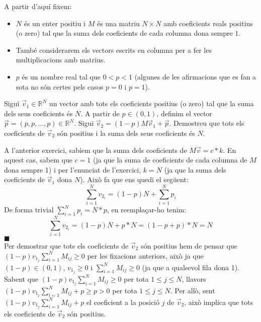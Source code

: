 \documentclass[a4paper, 12pt]{article}
\begin{document}
    \noindent A partir d'aquí fixem:
    \begin{itemize}
        \item $N$ és un enter positiu i $M$ és una matriu $N \times N$ amb coeficients reals positius
        (o zero) tal que la suma dels coeficients de cada columna dona sempre $1$.
        \item També considerarem els vectors escrits en columna per a fer les multiplicacions amb
        matrius.
        \item $p$ és un nombre real tal que $0 < p < 1$ (algunes de les afirmacions que es fan a sota
        no són certes pels casos $p = 0$ i $p = 1$).
    \end{itemize}
    
    \begin{exercici}
        Sigui $\vec{v}_1 \in \mathbb{R}^N$ un vector amb tots els coeficients positius (o zero) tal que
        la suma dels seus coeficients és $N$. A partir de $p \in (0, 1)$, definim el vector $\vec{p} = (p, p, \dots, p) \in \mathbb{R}^N$.
        Sigui $\vec{v}_2 = (1 - p)M\vec{v}_1 + \vec{p}$. Demostreu que tots els coeficients de $\vec{v}_2$
        són positius i la suma dels seus coeficients és $N$. 
    \end{exercici}
    \begin{solucio}
        A l'anterior exercici, sabíem que la suma dels coeficients de $M\vec{v} = c*k$. En aquest cas,
        sabem que $c = 1$ (ja que la suma de coeficients de cada columna de $M$ dona sempre 1) i per
        l'enunciat de l'exercici, $k = N$ (ja que la suma dels coeficients de $\vec{v}_1$ dona $N$).
        Això fa que ens quedi el següent:
        \begin{displaymath}
            \sum_{i=1}^{N} v_{2_i} = (1-p)N+\sum_{i=1}^{N}p_i
        \end{displaymath}
        De forma trivial $\sum_{i=1}^{N}p_i = N*p$, en reemplaçar-ho tenim:
        \begin{displaymath}
            \sum_{i=1}^{N} v_{2_i} = (1-p)N+p*N = (1-p+p)*N = N
        \end{displaymath}
        \hfill$\blacksquare$\\
        Per demostrar que tots els coeficients de $\vec{v}_2$ són positius hem de pensar que $(1 - p) v_{1_j} \sum_{i=1}^{N}M_{ij} \geq 0$
        per les fixacions anteriors, això ja que $(1 - p) \in (0, 1)$, $v_{1_j} \geq 0$ i $\sum_{i=1}^{N}M_{ij} \geq 0$
        (ja que a qualsevol fila dona 1).\\
        Sabent que $(1 - p) v_{1_j} \sum_{i=1}^{N}M_{ij} \geq 0$ per tota $1 \leq j \leq N$, llavors $(1 - p) v_{1_j} \sum_{i=1}^{N}M_{ij} + p \geq p > 0$
        per tota $1 \leq j \leq N$. Per allò, sent $(1 - p) v_{1_j} \sum_{i=1}^{N}M_{ij} + p$ el
        coeficient a la posició $j$ de $\vec{v}_2$, això implica que tots els coeficients de $\vec{v}_2$
        són positius.
    \end{solucio}
    
\end{document}
